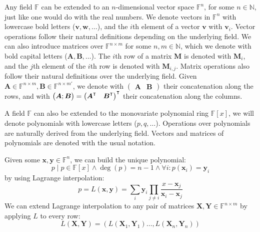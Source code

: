 \noindent Any field \(\mathbb{F}\) can be extended to an \(n\)-dimensional vector space
\(\mathbb{F}^n\), for some \(n \in \mathbb{N}\), just like one would do with the real numbers.
We denote vectors in \(\mathbb{F}^n\) with lowercase bold letters (\(\bm{v}, \bm{w}, \dots \)), and
the \(i\)th element of a vector \(\bm{v}\) with \(\bm{v}_i\).
Vector operations follow their natural definitions depending on the underlying field.
We can also introduce matrices over \(\mathbb{F}^{n \times m}\) for some \(n, m \in \mathbb{N}\),
which we denote with bold capital letters (\(\bm{A}, \bm{B}, \dots \)).
The \(i\)th row of a matrix \(\bm{M}\) is denoted with \(\bm{M}_i\), and the \(j\)th element of
the \(i\)th row is denoted with \(\bm{M}_{i,j}\).
Matrix operations also follow their natural definitions over the underlying field.
Given \(\bm{A} \in \mathbb{F}^{n \times m}, \bm{B} \in \mathbb{F}^{n \times m'}\), 
we denote with \(\begin{pmatrix}\bm{A} & \bm{B}\end{pmatrix}\) their concatenation along the rows, 
and with \(\begin{pmatrix}\bm{A}; \bm{B}\end{pmatrix} = 
{\begin{pmatrix}{\bm{A}}^{\transpose} & {\bm{B}}^{\transpose}\end{pmatrix}}^{\transpose}\) 
their concatenation along the columns.

A field \(\mathbb{F}\) can also be extended to the monovariate polynomial ring \(\mathbb{F}[x]\), 
we will denote polynomials with lowercase letters (\(p, q, \dots \)).
Operations over polynomials are naturally derived from the underlying field.
Vectors and matrices of polynomials are denoted with the usual notation.

Given some \(\bm{x}, \bm{y} \in \mathbb{F}^n\), we can build the unique polynomial:
\[p \mid {p \in \mathbb{F}[x]} \land {\deg(p) = n-1} \land {\forall i\colon p(\bm{x}_i) = \bm{y}_i}\]
by using Lagrange interpolation:
\[p = L(\bm{x}, \bm{y}) =
	\sum_{i}{\bm{y}_{i}\prod_{j \neq i}{\frac{x - \bm{x}_j}{\bm{x}_i - \bm{x}_j}}}\]
We can extend Lagrange interpolation to any pair of matrices
\(\bm{X}, \bm{Y} \in \mathbb{F}^{n\times m}\) by applying \(L\) to every row:
\[L(\bm{X}, \bm{Y}) = (L(\bm{X}_1, \bm{Y}_1) \dots, L(\bm{X}_n, \bm{Y}_n)) \]
